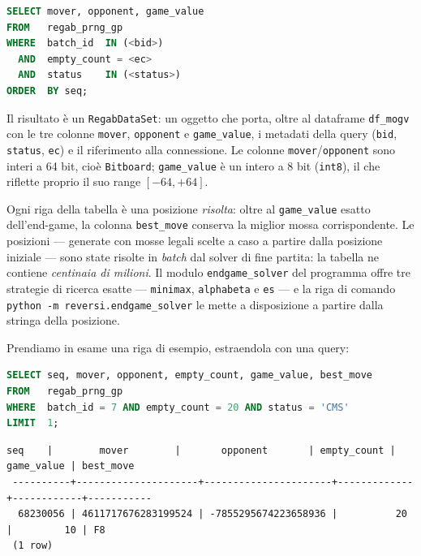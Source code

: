 \begin{lstlisting}[language=sql, caption={La forma dell'estrazione dal database (l'istruzione costruita da \texttt{regab\_gp\_as\_df}).}]
SELECT mover, opponent, game_value
FROM   regab_prng_gp
WHERE  batch_id  IN (<bid>)
  AND  empty_count = <ec>
  AND  status    IN (<status>)
ORDER  BY seq;
\end{lstlisting}

Il risultato è un \texttt{RegabDataSet}: un oggetto che porta, oltre al
dataframe \texttt{df\_mogv} con le tre colonne \texttt{mover}, \texttt{opponent}
e \texttt{game\_value}, i metadati della query (\texttt{bid}, \texttt{status},
\texttt{ec}) e il riferimento alla connessione. Le colonne
\texttt{mover}/\texttt{opponent} sono interi a 64 bit, cioè \texttt{Bitboard};
\texttt{game\_value} è un intero a 8 bit (\texttt{int8}), il che riflette
proprio il suo range $[-64, +64]$.

Ogni riga della tabella è una posizione \emph{risolta}: oltre al
\texttt{game\_value} esatto dell'end-game, la colonna \texttt{best\_move}
conserva la miglior mossa corrispondente. Le posizioni — generate con mosse
legali scelte a caso a partire dalla posizione iniziale — sono state risolte
in \emph{batch} dal solver di fine partita: la tabella ne contiene
\emph{centinaia di milioni}. Il modulo \texttt{endgame\_solver} del
programma offre tre strategie di ricerca esatte — \texttt{minimax},
\texttt{alphabeta} e \texttt{es} — e la riga di comando
\texttt{python -m reversi.endgame\_solver} le mette a disposizione a partire
dalla stringa della posizione.

Prendiamo in esame una riga di esempio, estraendola con una query:

\begin{lstlisting}[language=sql, caption={Una riga di esempio di \texttt{regab\_prng\_gp} (una selezione libera, non l'estrazione del livello).}]
SELECT seq, mover, opponent, empty_count, game_value, best_move
FROM   regab_prng_gp
WHERE  batch_id = 7 AND empty_count = 20 AND status = 'CMS'
LIMIT  1;
\end{lstlisting}

\begin{lstlisting}[caption={La riga restituita.}]
   seq    |        mover        |       opponent       | empty_count | game_value | best_move
 ----------+---------------------+----------------------+-------------+------------+-----------
  68230056 | 4611717676283199524 | -7855295674223658936 |          20 |         10 | F8
 (1 row)
\end{lstlisting}

